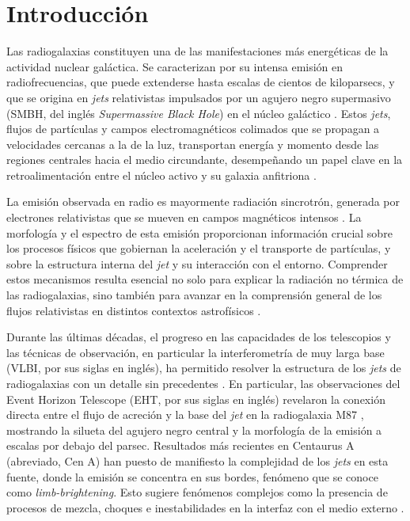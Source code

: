 \chapter{Introducción}\label{cha:introduccion}

	Las radiogalaxias constituyen una de las manifestaciones más energéticas de la actividad nuclear galáctica.
	Se caracterizan por su intensa emisión en radiofrecuencias, que puede extenderse hasta escalas de cientos de kiloparsecs, y que se origina en \textit{jets} relativistas impulsados por un agujero negro supermasivo (SMBH, del inglés \textit{Supermassive Black Hole}) en el núcleo galáctico \citep{Fanaroff1974, begelman1984theory}.
	Estos \textit{jets}, flujos de partículas y campos electromagnéticos colimados que se propagan a velocidades cercanas a la de la luz, transportan energía y momento desde las regiones centrales hacia el medio circundante, desempeñando un papel clave en la retroalimentación entre el núcleo activo y su galaxia anfitriona \citep{Fabian2012, Blandford2019}.

	La emisión observada en radio es mayormente radiación sincrotrón, generada por electrones relativistas que se mueven en campos magnéticos intensos \citep{Blumenthal1970}.
	La morfología y el espectro de esta emisión proporcionan información crucial sobre los procesos físicos que gobiernan la aceleración y el transporte de partículas, y sobre la estructura interna del \textit{jet} y su interacción con el entorno.
	Comprender estos mecanismos resulta esencial no solo para explicar la radiación no térmica de las radiogalaxias, sino también para avanzar en la comprensión general de los flujos relativistas en distintos contextos astrofísicos \citep{Antonucci1993, 1995PASP..107..803U}.

	Durante las últimas décadas, el progreso en las capacidades de los telescopios y las técnicas de observación, en particular la interferometría de muy larga base (VLBI, por sus siglas en inglés), ha permitido resolver la estructura de los \textit{jets} de radiogalaxias con un detalle sin precedentes \citep[e.g.,][]{EHT_2019_M87_I, EHT_MW_2021}. 
	En particular, las observaciones del Event Horizon Telescope (EHT, por sus siglas en inglés) revelaron la conexión directa entre el flujo de acreción y la base del \textit{jet} en la radiogalaxia M87 \citep{EHT_2019_M87_I, EHT_2023_M87}, mostrando la silueta del agujero negro central y la morfología de la emisión a escalas por debajo del parsec.
	Resultados más recientes en Centaurus A (abreviado, Cen A) han puesto de manifiesto la complejidad de los \textit{jets} en esta fuente, donde la emisión se concentra en sus bordes, fenómeno que se conoce como {\it limb-brightening}. Esto sugiere fenómenos complejos como la presencia de procesos de mezcla, choques e inestabilidades en la interfaz con el medio externo \citep{2021NatAs...5.1017J}.

